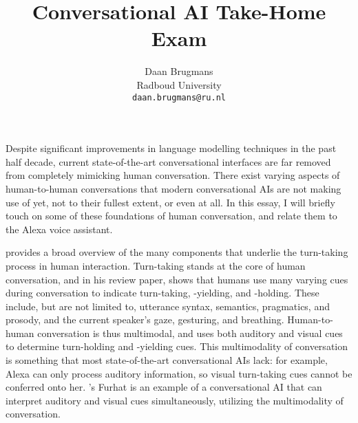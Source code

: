 \documentclass[11pt]{article}
\title{Conversational AI Take-Home Exam}
\author{Daan Brugmans \\
  Radboud University\\
  \texttt{daan.brugmans@ru.nl}
}
\begin{document}
\maketitle
        


Despite significant improvements in language modelling techniques in the past half decade, current state-of-the-art conversational interfaces are far removed from completely mimicking human conversation.
There exist varying aspects of human-to-human conversations that modern conversational AIs are not making use of yet, not to their fullest extent, or even at all.
In this essay, I will briefly touch on some of these foundations of human conversation, and relate them to the Alexa voice assistant.

\citet{skantze2021turntaking} provides a broad overview of the many components that underlie the turn-taking process in human interaction.
Turn-taking stands at the core of human conversation, and in his review paper, \citeauthor{skantze2021turntaking} shows that humans use many varying cues during conversation to indicate turn-taking, -yielding, and -holding.
These include, but are not limited to, utterance syntax, semantics, pragmatics, and prosody, and the current speaker's gaze, gesturing, and breathing.
Human-to-human conversation is thus multimodal, and uses both auditory and visual cues to determine turn-holding and -yielding cues.
This multimodality of conversation is something that most state-of-the-art conversational AIs lack: for example, Alexa can only process auditory information, so visual turn-taking cues cannot be conferred onto her.
\citeauthor{skantze2021turntaking}'s Furhat is an example of a conversational AI that can interpret auditory and visual cues simultaneously, utilizing the multimodality of conversation.
\end{document}
